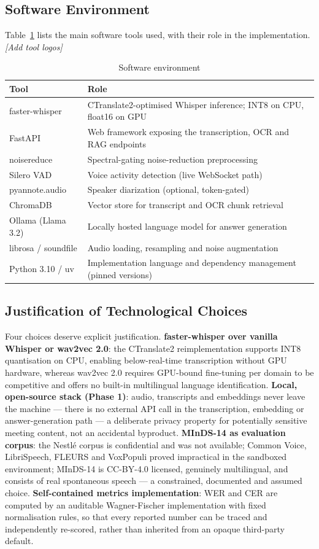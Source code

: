 \documentclass[12pt]{report}
\newcommand{\todo}[1]{\textsl{\colorbox[rgb]{1,1,0}{#1}}}
\begin{document}
\subsection{Software Environment}
Table~\ref{tab:software} lists the main software tools used, with their role in the implementation. \todo{[Add tool logos]}
\begin{table}[H]
\centering
\small
\begin{tabular}{|l|p{9.5cm}|}
\hline
\textbf{Tool} & \textbf{Role} \\ \hline
faster-whisper & CTranslate2-optimised Whisper inference; INT8 on CPU, float16 on GPU \\ \hline
FastAPI & Web framework exposing the transcription, OCR and RAG endpoints \\ \hline
noisereduce & Spectral-gating noise-reduction preprocessing \\ \hline
Silero VAD & Voice activity detection (live WebSocket path) \\ \hline
pyannote.audio & Speaker diarization (optional, token-gated) \\ \hline
ChromaDB & Vector store for transcript and OCR chunk retrieval \\ \hline
Ollama (Llama 3.2) & Locally hosted language model for answer generation \\ \hline
librosa / soundfile & Audio loading, resampling and noise augmentation \\ \hline
Python 3.10 / uv & Implementation language and dependency management (pinned versions) \\ \hline
\end{tabular}
\caption{Software environment}
\label{tab:software}
\end{table}
\subsection{Justification of Technological Choices}
Four choices deserve explicit justification. \textbf{faster-whisper over vanilla Whisper or wav2vec 2.0}: the CTranslate2 reimplementation supports INT8 quantisation on CPU, enabling below-real-time transcription without GPU hardware, whereas wav2vec 2.0 requires GPU-bound fine-tuning per domain to be competitive and offers no built-in multilingual language identification. \textbf{Local, open-source stack (Phase 1)}: audio, transcripts and embeddings never leave the machine --- there is no external API call in the transcription, embedding or answer-generation path --- a deliberate privacy property for potentially sensitive meeting content, not an accidental byproduct. \textbf{MInDS-14 as evaluation corpus}: the Nestl\'e corpus is confidential and was not available; Common Voice, LibriSpeech, FLEURS and VoxPopuli proved impractical in the sandboxed environment; MInDS-14 is CC-BY-4.0 licensed, genuinely multilingual, and consists of real spontaneous speech --- a constrained, documented and assumed choice. \textbf{Self-contained metrics implementation}: WER and CER are computed by an auditable Wagner-Fischer implementation with fixed normalisation rules, so that every reported number can be traced and independently re-scored, rather than inherited from an opaque third-party default.
\end{document}
